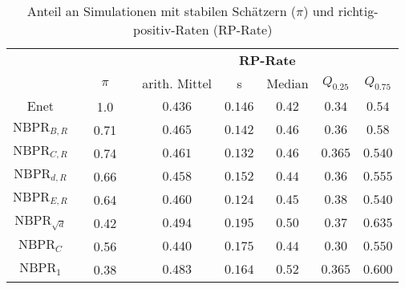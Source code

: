 \documentclass{beamer}
\begin{document}
\begin{frame}
\begin{table}[h]
\begin{tabular}{clclccccc}
\multicolumn{1}{l}{}     &  & \multicolumn{1}{l}{} &  & \multicolumn{5}{c}{\textbf{RP-Rate}}                       \\ \cline{3-3} \cline{5-9} 
\multicolumn{1}{l}{}     &  & $\pi$                &  & arith. Mittel & s       & Median & $Q_{0.25}$ & $Q_{0.75}$ \\ \cline{3-3} \cline{5-9} 
$\text{Enet}$            &  & 1.0                  &  & $0.436$       & $0.146$ & $0.42$ & $0.34$     & $0.54$     \\
$\text{NBPR}_{B,R}$      &  & 0.71                 &  & $0.465$       & $0.142$ & $0.46$ & $0.36$     & $0.58$     \\
$\text{NBPR}_{C,R}$      &  & 0.74                 &  & $0.461$       & $0.132$ & $0.46$ & $0.365$    & $0.540$    \\
$\text{NBPR}_{d,R}$      &  & 0.66                 &  & $0.458$       & $0.152$ & $0.44$ & $0.36$     & $0.555$    \\
$\text{NBPR}_{E,R}$      &  & 0.64                 &  & $0.460$       & $0.124$ & $0.45$ & $0.38$     & $0.540$    \\
$\text{NBPR}_{\sqrt{d}}$ &  & 0.42                 &  & $0.494$       & $0.195$ & $0.50$  & $0.37$     & $0.635$    \\
$\text{NBPR}_{C}$        &  & 0.56                 &  & $0.440$       & $0.175$ & $0.44$ & $0.30$     & $0.550$     \\
$\text{NBPR}_{1}$        &  & 0.38                 &  & $0.483$       & $0.164$ & $0.52$ & $0.365$    & $0.600$   
\end{tabular}
\caption{Anteil an Simulationen mit stabilen Schätzern ($\pi$) und richtig-positiv-Raten (RP-Rate)}
\end{table}
\end{frame}
\end{document}
